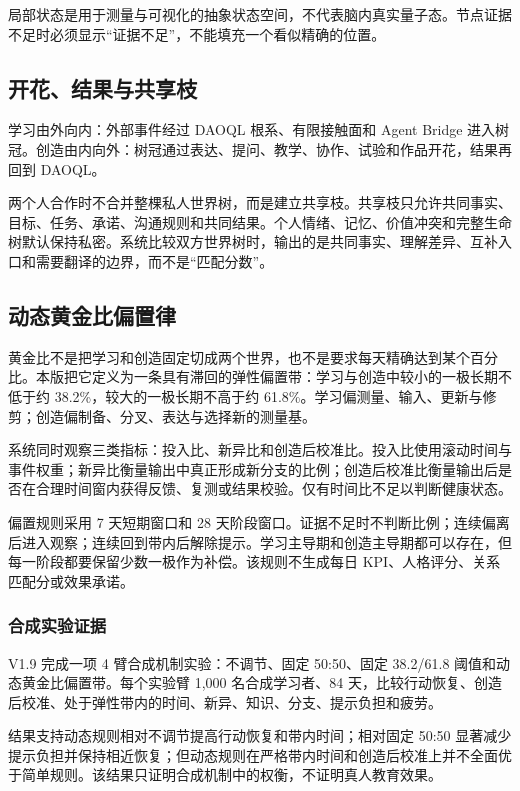 \documentclass[UTF8,a4paper,11pt]{ctexart}
\begin{document}
局部状态是用于测量与可视化的抽象状态空间，不代表脑内真实量子态。节点证据不足时必须显示“证据不足”，不能填充一个看似精确的位置。

\subsection{开花、结果与共享枝}

学习由外向内：外部事件经过 DAOQL 根系、有限接触面和 Agent Bridge 进入树冠。创造由内向外：树冠通过表达、提问、教学、协作、试验和作品开花，结果再回到 DAOQL。

两个人合作时不合并整棵私人世界树，而是建立共享枝。共享枝只允许共同事实、目标、任务、承诺、沟通规则和共同结果。个人情绪、记忆、价值冲突和完整生命树默认保持私密。系统比较双方世界树时，输出的是共同事实、理解差异、互补入口和需要翻译的边界，而不是“匹配分数”。

\subsection{动态黄金比偏置律}

黄金比不是把学习和创造固定切成两个世界，也不是要求每天精确达到某个百分比。本版把它定义为一条具有滞回的弹性偏置带：学习与创造中较小的一极长期不低于约 38.2\%，较大的一极长期不高于约 61.8\%。学习偏测量、输入、更新与修剪；创造偏制备、分叉、表达与选择新的测量基。

系统同时观察三类指标：投入比、新异比和创造后校准比。投入比使用滚动时间与事件权重；新异比衡量输出中真正形成新分支的比例；创造后校准比衡量输出后是否在合理时间窗内获得反馈、复测或结果校验。仅有时间比不足以判断健康状态。

偏置规则采用 7 天短期窗口和 28 天阶段窗口。证据不足时不判断比例；连续偏离后进入观察；连续回到带内后解除提示。学习主导期和创造主导期都可以存在，但每一阶段都要保留少数一极作为补偿。该规则不生成每日 KPI、人格评分、关系匹配分或效果承诺。

\subsubsection{合成实验证据}

V1.9 完成一项 4 臂合成机制实验：不调节、固定 50:50、固定 38.2/61.8 阈值和动态黄金比偏置带。每个实验臂 1,000 名合成学习者、84 天，比较行动恢复、创造后校准、处于弹性带内的时间、新异、知识、分支、提示负担和疲劳。

结果支持动态规则相对不调节提高行动恢复和带内时间；相对固定 50:50 显著减少提示负担并保持相近恢复；但动态规则在严格带内时间和创造后校准上并不全面优于简单规则。该结果只证明合成机制中的权衡，不证明真人教育效果。
\end{document}
